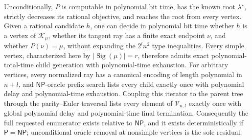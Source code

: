 Unconditionally, \(P\) is computable in polynomial bit time, has the known root \(\lambda^\star\), strictly decreases its rational objective, and reaches the root from every vertex. Given a rational candidate \(h\), one can decide in polynomial bit time whether \(h\) is a vertex of \(\mathcal K_\mu\), whether its tangent ray has a finite exact endpoint \(\nu\), and whether \(P(\nu)=\mu\), without expanding the \(2^l n^2\) type inequalities. Every simple vertex, characterized here by \(|\operatorname{Sig}(\mu)|=r\), therefore admits exact polynomial-total-time child generation with polynomial-time exhaustion. For arbitrary vertices, every normalized ray has a canonical encoding of length polynomial in \(n+l\), and \(\mathsf{NP}\)-oracle prefix search lists every child exactly once with polynomial delay and polynomial-time exhaustion. Coupling this iterator to the parent tree through the parity--Euler traversal lists every element of \(\mathcal V_{n,l}\) exactly once with global polynomial delay and polynomial-time final termination. Consequently the full requested enumerator exists relative to \(\mathsf{NP}\), and it exists deterministically if \(\mathsf P=\mathsf{NP}\); unconditional oracle removal at nonsimple vertices is the sole residual.
